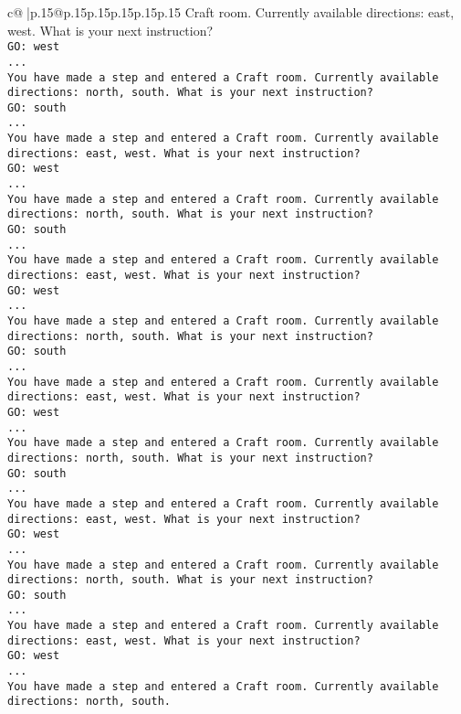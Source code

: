 \documentclass{article}
\begin{document}
{\begin{supertabular}{c@{$\;$}|p{.15\linewidth}@{}p{.15\linewidth}p{.15\linewidth}p{.15\linewidth}p{.15\linewidth}p{.15\linewidth}}
{{{Craft room. Currently available directions: east, west. What is your next instruction?\\ \tt GO: west\\ \tt ...\\ \tt You have made a step and entered a Craft room. Currently available directions: north, south. What is your next instruction?\\ \tt GO: south\\ \tt ...\\ \tt You have made a step and entered a Craft room. Currently available directions: east, west. What is your next instruction?\\ \tt GO: west\\ \tt ...\\ \tt You have made a step and entered a Craft room. Currently available directions: north, south. What is your next instruction?\\ \tt GO: south\\ \tt ...\\ \tt You have made a step and entered a Craft room. Currently available directions: east, west. What is your next instruction?\\ \tt GO: west\\ \tt ...\\ \tt You have made a step and entered a Craft room. Currently available directions: north, south. What is your next instruction?\\ \tt GO: south\\ \tt ...\\ \tt You have made a step and entered a Craft room. Currently available directions: east, west. What is your next instruction?\\ \tt GO: west\\ \tt ...\\ \tt You have made a step and entered a Craft room. Currently available directions: north, south. What is your next instruction?\\ \tt GO: south\\ \tt ...\\ \tt You have made a step and entered a Craft room. Currently available directions: east, west. What is your next instruction?\\ \tt GO: west\\ \tt ...\\ \tt You have made a step and entered a Craft room. Currently available directions: north, south. What is your next instruction?\\ \tt GO: south\\ \tt ...\\ \tt You have made a step and entered a Craft room. Currently available directions: east, west. What is your next instruction?\\ \tt GO: west\\ \tt ...\\ \tt You have made a step and entered a Craft room. Currently available directions: north, south. }}}
\end{supertabular}}
\end{document}
